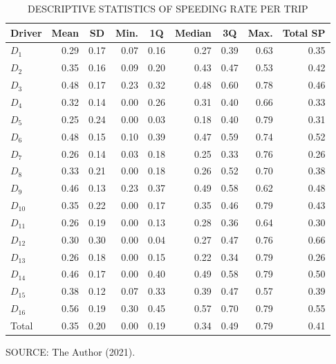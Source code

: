 \begin{table}[!htbp]
    \footnotesize
    \captionsetup{justification=raggedright,
        singlelinecheck=false,
        font=footnotesize}
    \caption{DESCRIPTIVE STATISTICS OF SPEEDING RATE PER TRIP}
    \centering
    \begin{tabular}{lrrrrrrrr}
        \hline
        \multicolumn{1}{c}{\textbf{Driver}} & \multicolumn{1}{c}{\textbf{Mean}} & \multicolumn{1}{c}{\textbf{SD}} & \multicolumn{1}{c}{\textbf{Min.}} & \multicolumn{1}{c}{\textbf{1Q}} & \multicolumn{1}{c}{\textbf{Median}} & \multicolumn{1}{c}{\textbf{3Q}} & \multicolumn{1}{c}{\textbf{Max.}} & \multicolumn{1}{c}{\textbf{Total SP}} \\
        \hline
        $D_1$ & 0.29 & 0.17 & 0.07 & 0.16 & 0.27 & 0.39 & 0.63 & 0.35 \\ 
        $D_2$ & 0.35 & 0.16 & 0.09 & 0.20 & 0.43 & 0.47 & 0.53 & 0.42 \\ 
        $D_3$ & 0.48 & 0.17 & 0.23 & 0.32 & 0.48 & 0.60 & 0.78 & 0.46 \\ 
        $D_4$ & 0.32 & 0.14 & 0.00 & 0.26 & 0.31 & 0.40 & 0.66 & 0.33 \\ 
        $D_5$ & 0.25 & 0.24 & 0.00 & 0.03 & 0.18 & 0.40 & 0.79 & 0.31 \\ 
        $D_6$ & 0.48 & 0.15 & 0.10 & 0.39 & 0.47 & 0.59 & 0.74 & 0.52 \\ 
        $D_7$ & 0.26 & 0.14 & 0.03 & 0.18 & 0.25 & 0.33 & 0.76 & 0.26 \\ 
        $D_8$ & 0.33 & 0.21 & 0.00 & 0.18 & 0.26 & 0.52 & 0.70 & 0.38 \\ 
        $D_9$ & 0.46 & 0.13 & 0.23 & 0.37 & 0.49 & 0.58 & 0.62 & 0.48 \\ 
        $D_{10}$ & 0.35 & 0.22 & 0.00 & 0.17 & 0.35 & 0.46 & 0.79 & 0.43 \\ 
        $D_{11}$ & 0.26 & 0.19 & 0.00 & 0.13 & 0.28 & 0.36 & 0.64 & 0.30 \\ 
        $D_{12}$ & 0.30 & 0.30 & 0.00 & 0.04 & 0.27 & 0.47 & 0.76 & 0.66 \\ 
        $D_{13}$ & 0.26 & 0.18 & 0.00 & 0.15 & 0.22 & 0.34 & 0.79 & 0.26 \\ 
        $D_{14}$ & 0.46 & 0.17 & 0.00 & 0.40 & 0.49 & 0.58 & 0.79 & 0.50 \\ 
        $D_{15}$ & 0.38 & 0.12 & 0.07 & 0.33 & 0.39 & 0.47 & 0.57 & 0.39 \\ 
        $D_{16}$ & 0.56 & 0.19 & 0.30 & 0.45 & 0.57 & 0.70 & 0.79 & 0.55 \\ 
        \hline 
        Total & 0.35 & 0.20 & 0.00 & 0.19 & 0.34 & 0.49 & 0.79 & 0.41 \\
        \hline
    \end{tabular}
    \label{tab:speeding}
    \par \vspace{2mm} \footnotesize \raggedright
    SOURCE: The Author (2021).
\end{table}

